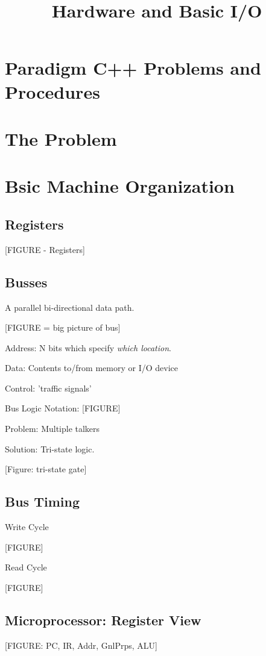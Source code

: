 \documentclass{article}	%
\title{Hardware and Basic I/O}
\begin{document}
\section*{Paradigm C++ Problems and Procedures}
\section*{The Problem}




\section{Bsic Machine Organization}
\subsection{Registers}

[FIGURE - Registers]

\subsection{Busses}

A parallel bi-directional data path.

[FIGURE = big picture of bus]

Address: N bits which specify {\it which location}.

Data:   Contents to/from memory or I/O device

Control:  'traffic signals'

Bus Logic Notation:  [FIGURE]

Problem:  Multiple talkers

Solution:  Tri-state logic.

  [Figure: tri-state gate]

\subsection{Bus Timing}

Write Cycle

      [FIGURE]

Read Cycle

      [FIGURE]

\subsection{Microprocessor: Register View}

 [FIGURE:  PC, IR, Addr, GnlPrps, ALU]
\end{document}
